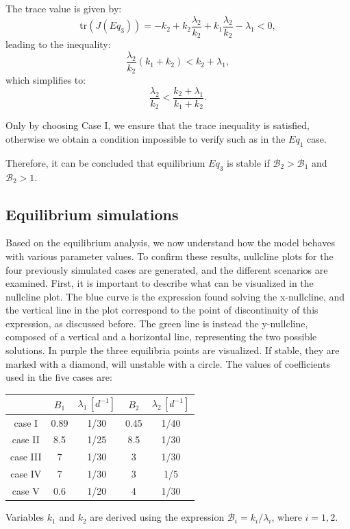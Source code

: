 The trace value is given by:
\[
\text{tr}(J(Eq_3)) = -k_2 + k_2 \frac{\lambda_2}{k_2} + k_1 \frac{\lambda_2}{k_2} - \lambda_1 < 0,
\]
leading to the inequality:
\[
\frac{\lambda_2}{k_2} (k_1 + k_2) < k_2 + \lambda_1,
\]
which simplifies to:
\[
\frac{\lambda_2}{k_2} < \frac{k_2 + \lambda_1}{k_1 + k_2}.
\]

Only by choosing Case I, we ensure that the trace inequality is satisfied, otherwise we obtain a condition impossible to verify such as in the $Eq_1$ case.

Therefore, it can be concluded that equilibrium \(Eq_3\) is stable if \(\mathcal{B}_2 > \mathcal{B}_1\) and \(\mathcal{B}_2 > 1\).

 
\subsection{Equilibrium simulations}

Based on the equilibrium analysis, we now understand how the model behaves with various parameter values. To confirm these results, nullcline plots for the four previously simulated cases are generated, and the different scenarios are examined. First, it is important to describe what can be visualized in the nullcline plot. The blue curve is the expression found solving the x-nullcline, and the vertical line in the plot correspond to the point of discontinuity of this expression, as discussed before. The green line is instead the y-nullcline, composed of a vertical and a horizontal line, representing the two possible solutions. In purple the three equilibria points are visualized. If stable, they are marked with a diamond, will unstable with a circle.  
The values of coefficients used in the five cases are:
\begin{center}
 \begin{tabular}{|c|c|c|c|c|}
 	\hline
 	& $B_1$ & $\lambda_1 \,[d^{-1}]$ & $B_2$ & $\lambda_2 \, [d^{-1}]$ \\
 	\hline
 	case I & 0.89 & 1/30 & 0.45 & 1/40 \\
 	\hline
 	case II & 8.5 & 1/25 & 8.5 & 1/30 \\
 	\hline
 	case III & 7 & 1/30 & 3 & 1/30 \\
 	\hline
 	case IV & 7 & 1/30 & 3 & 1/5 \\
 	\hline
 	case V & 0.6 & 1/20 & 4& 1/30 \\  
 	\hline
 \end{tabular}
\end{center}
Variables $k_1$ and $k_2$ are derived using the expression $\mathcal{B}_i = k_i/\lambda_i$, where $i = 1, 2$.\\

